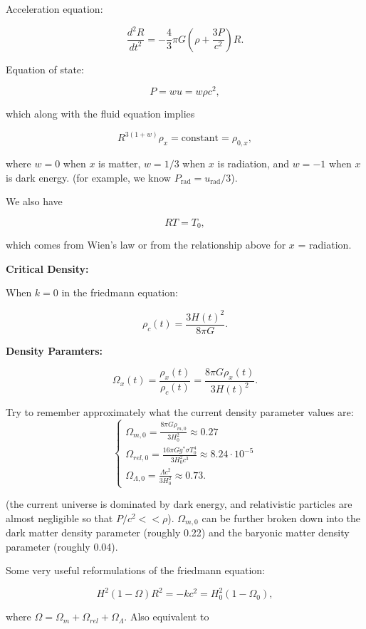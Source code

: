 \documentclass[12pt]{article}
\newcommand{\V}{

\vspace{\baselineskip}

}
\begin{document}
Acceleration equation:

\[\frac{d^{2}R}{dt^{2}} = -\frac{4}{3}\pi G\left(\rho + \frac{3P}{c^{2}}\right)R.\]

Equation of state:

\[P = wu = w\rho c^{2},\]

which along with the fluid equation implies

\[R^{3(1+w)}\rho_{x} = \text{constant} = \rho_{0,x},\]

where $w=0$ when $x$ is matter, $w=1/3$ when $x$ is radiation, and $w=-1$ when $x$ is dark energy. (for example, we know $P_{\text{rad}} = u_{\text{rad}}/3$).

We also have 

\[RT = T_{0},\]

which comes from Wien's law or from the relationship above for $x$ = radiation.\V

\textbf{Critical Density:}

When $k=0$ in the friedmann equation:

\begin{equation*}
\rho_{c}(t) = \frac{3H(t)^{2}}{8\pi G}.
\end{equation*}\V

\textbf{Density Paramters:}

\[\Omega_{x}(t) = \frac{\rho_{x}(t)}{\rho_{c}(t)} = \frac{8\pi G\rho_{x}(t)}{3H(t)^{2}}.\]

Try to remember approximately what the current density parameter values are:
\[\begin{cases}
\displaystyle \Omega_{m,0} =  \frac{8\pi G\rho_{m,0}}{3H_{0}^{2}} \approx 0.27 \\
\displaystyle \Omega_{rel,0} = \frac{16\pi Gg^{*}\sigma T_{0}^{4}}{3H_{0}^{2}c^{3}} \approx 8.24\cdot 10^{-5}\\
\displaystyle \Omega_{\Lambda,0} = \frac{\Lambda c^{2}}{3H_{0}^{2}} \approx 0.73.
\end{cases}
\]

(the current universe is dominated by dark energy, and relativistic particles are almost negligible so that $P/c^{2} << \rho$). $\Omega_{m,0}$ can be further broken down into the dark matter density parameter (roughly 0.22) and the baryonic matter density parameter (roughly 0.04). \V

Some very useful reformulations of the friedmann equation: 

\[H^{2}(1-\Omega)R^{2} = -kc^{2} = H_{0}^{2}(1-\Omega_{0}),\]

where $\Omega = \Omega_{m} + \Omega_{rel} + \Omega_{\Lambda}$. Also equivalent to
\end{document}
